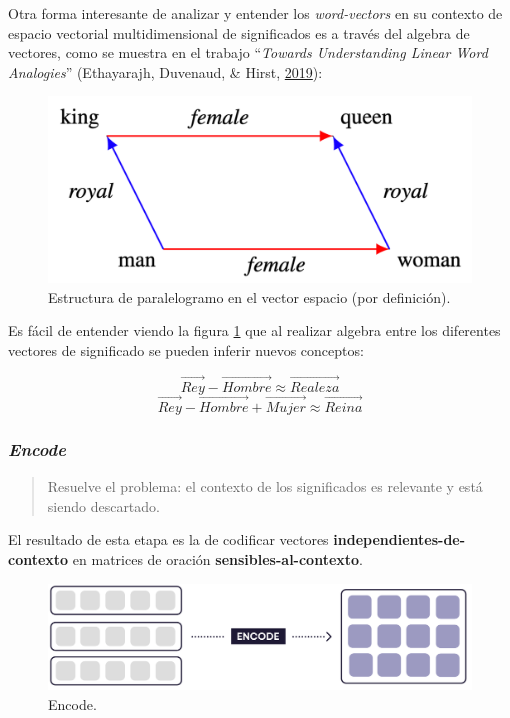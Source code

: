 \documentclass[12pt,a4paper,]{scrartcl}
\begin{document}
Otra forma interesante de analizar y entender los \emph{word-vectors} en su contexto de espacio vectorial multidimensional de significados es a través del algebra de vectores, como se muestra en el trabajo \enquote{\emph{Towards Understanding Linear Word Analogies}} (Ethayarajh, Duvenaud, \& Hirst, \protect\hyperlink{ref-ethayarajh-etal-2019-towards}{2019}):

\begin{figure}[H]

{\centering \includegraphics[width=0.6\linewidth]{assets/parallelogram.pdf} 

}

\caption{Estructura de paralelogramo en el vector espacio (por definición).}\label{fig:vec-parallelogram}
\end{figure}

Es fácil de entender viendo la figura \ref{fig:vec-parallelogram} que al realizar algebra entre los diferentes vectores de significado se pueden inferir nuevos conceptos:

\[\vec{Rey} - \vec{Hombre} \approx \vec{Realeza}\]
\[\vec{Rey} - \vec{Hombre} + \vec{Mujer} \approx \vec{Reina}\]

\hypertarget{encode}{%
\subsubsection{\texorpdfstring{\emph{Encode}}{Encode}}\label{encode}}

\begin{quote}
Resuelve el problema: el contexto de los significados es relevante y está siendo descartado.
\end{quote}

El resultado de esta etapa es la de codificar vectores \textbf{independientes-de-contexto} en matrices de oración \textbf{sensibles-al-contexto}.

\begin{figure}[H]

{\centering \includegraphics{assets/deep-learning-formula-nlp_encode.pdf} 

}

\caption{Encode.}\label{fig:formula-encode}
\end{figure}
\end{document}
